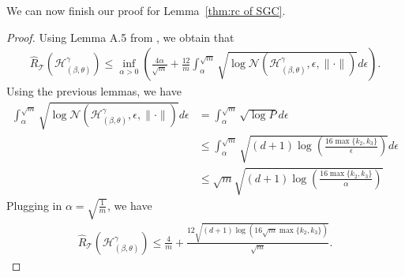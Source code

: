 We can now finish our proof for Lemma~\ref{thm:rc of SGC}.
\begin{proof}
    Using Lemma A.5 from \cite{bartlett2017spectrally}, we obtain that 
    \begin{align*}
        \hat R_{\mathcal{T}}(\mathcal{H}_{(\beta, \theta)}^\gamma)
        \leq \inf_{\alpha > 0}\left(\frac{4\alpha}{\sqrt{m}} + \frac{12}{m} \int_{\alpha}^{\sqrt{m}} \sqrt{\log \mathcal{N}(\mathcal{H}_{(\beta, \theta)}^\gamma, \epsilon, \|\cdot \|)} d\epsilon\right).
    \end{align*}
    Using the previous lemmas, we have
    \begin{align*}
        \int_{\alpha}^{\sqrt{m}} \sqrt{\log \mathcal{N}(\mathcal{H}_{(\beta, \theta)}^\gamma, \epsilon, \|\cdot \|)} d\epsilon
        &= \int_{\alpha}^{\sqrt{m}} \sqrt{\log P} d\epsilon\\
        &\leq \int_{\alpha}^{\sqrt{m}} \sqrt{(d+1)\log \left(\frac{16\max\{k_2, k_3\}}{\epsilon}\right)} d\epsilon\\
        &\leq \sqrt{m} \sqrt{(d+1) \log \left(\frac{16\max\{k_2, k_3\}}{\alpha}\right)}
    \end{align*}
    Plugging in $\alpha = \sqrt{\frac{1}{m}}$, we have
    \begin{align*}
        \hat R_{\mathcal{T}}(\mathcal{H}_{(\beta, \theta)}^\gamma)
        \leq \frac{4}{m} + \frac{12\sqrt{(d+1)\log(16\sqrt{m}\max\{k_2, k_3\})}}{\sqrt{m}}.
    \end{align*}
\end{proof}


